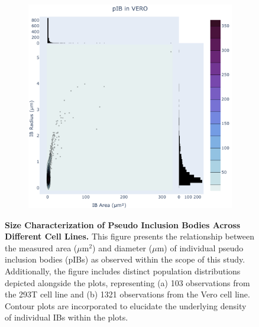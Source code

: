 \begin{figure}
\begin{subfigure}{0.495\textwidth}
        \includegraphics[width=\textwidth]{09. Chapter 4/Figs/01. pIB/01. pIB characterisation/02. heatmap_pib-vero.pdf}
    \end{subfigure}
    \caption[Size Characterization of Pseudo Inclusion Bodies Across Different Cell Lines.]{\textbf{Size Characterization of Pseudo Inclusion Bodies Across Different Cell Lines.} This figure presents the relationship between the measured area (\(\mu \mbox{m}^2\)) and diameter (\(\mu \mbox{m}\)) of individual pseudo inclusion bodies (pIBs) as observed within the scope of this study. Additionally, the figure includes distinct population distributions depicted alongside the plots, representing (a) 103 observations from the 293T cell line and (b) 1321 observations from the Vero cell line. Contour plots are incorporated to elucidate the underlying density of individual IBs within the plots.}
    \label{fig:Size Characterization of Pseudo Inclusion Bodies Across Different Cell Lines}
\end{figure}


